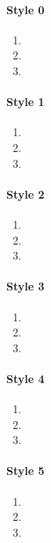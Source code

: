 \documentclass{article}
\begin{document}
    \paragraph{Style 0}
    \begin{enumerate}
        \item \lipsum[1][1-2]
        \item \lipsum[2][1-2]
        \item \lipsum[3][1-2]
    \end{enumerate}
    \paragraph{Style 1}
    \begin{enumerate}[label=\alph*]
        \item \lipsum[1][1-2]
        \item \lipsum[2][1-2]
        \item \lipsum[3][1-2]
    \end{enumerate}
    \paragraph{Style 2}
    \begin{enumerate}[label=\Alph*]
        \item \lipsum[1][1-2]
        \item \lipsum[2][1-2]
        \item \lipsum[3][1-2]
    \end{enumerate}
    \paragraph{Style 3}
    \begin{enumerate}[label=\arabic*]
        \item \lipsum[1][1-2]
        \item \lipsum[2][1-2]
        \item \lipsum[3][1-2]
    \end{enumerate}
    \paragraph{Style 4}
    \begin{enumerate}[label=\Roman*]
        \item \lipsum[1][1-2]
        \item \lipsum[2][1-2]
        \item \lipsum[3][1-2]
    \end{enumerate}
    \paragraph{Style 5}
    \begin{enumerate}[label=\roman*]
        \item \lipsum[1][1-2]
        \item \lipsum[2][1-2]
        \item \lipsum[3][1-2]
    \end{enumerate}
\end{document}
